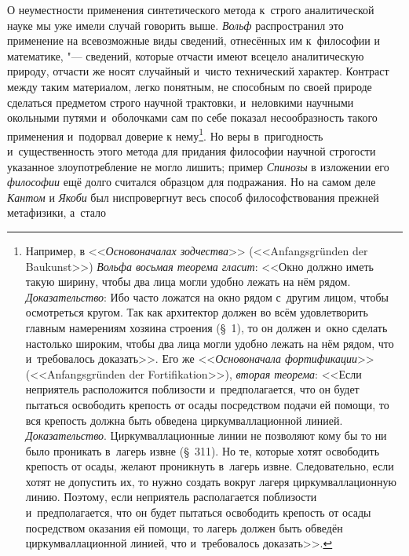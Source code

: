 О неуместности применения синтетического метода к~строго
аналитической науке мы уже имели случай говорить выше.
{\em Вольф} распространил
это применение на всевозможные виды сведений, отнесённых им к~философии и
математике, "--- сведений, которые отчасти имеют всецело
аналитическую природу, отчасти же носят случайный и~чисто технический
характер. Контраст между таким материалом, легко понятным, не способным по
своей природе сделаться предметом строго научной трактовки, и~неловкими
научными окольными путями и~оболочками сам по себе показал
несообразность такого применения и~подорвал доверие к
нему\footnote{Например, в <<{\em Основоначалах зодчества}>>
(<<Anfangs\-gründen der Bau\-kunst>>) {\em Вольфа восьмая теорема гласит}:
<<Окно должно иметь такую ширину, чтобы два лица
могли удобно лежать на нём рядом. {\em Доказательство}:
Ибо часто ложатся на окно рядом с~другим лицом, чтобы
осмотреться кругом. Так как архитектор должен во всём удовлетворить главным
намерениям хозяина строения (\S~1), то он должен и~окно сделать настолько
широким, чтобы два лица могли удобно лежать на нём рядом, что и~требовалось
доказать>>. Его же <<{\em Основоначала фортификации}>>
(<<Anfangs\-grün\-den der For\-tifika\-tion>>), {\em вторая теорема}:
<<Если неприятель расположится поблизости и~предполагается,
что он будет пытаться освободить крепость от осады посредством подачи ей
помощи, то вся крепость должна быть обведена циркумваллационной
линией. {\em Доказательство}.
Циркумваллационные линии не позволяют кому бы то ни было
проникать в~лагерь извне (\S~311). Но те, которые хотят освободить крепость
от осады, желают проникнуть в~лагерь извне. Следовательно, если хотят не
допустить их, то нужно создать вокруг лагеря циркумваллационную линию.
Поэтому, если неприятель располагается поблизости и~предполагается, что он
будет пытаться освободить крепость от осады посредством оказания ей помощи,
то лагерь должен быть обведён циркумваллационной линией, что и~требовалось
доказать>>.}. Но веры в~пригодность и~существенность этого
метода для придания философии научной строгости указанное злоупотребление
не могло лишить; пример {\em Спинозы}
в изложении его
{\em философии} ещё долго
считался образцом для подражания. Но на самом деле
{\em Кантом} и
{\em Якоби} был
ниспровергнут весь способ философствования прежней метафизики, а~стало
